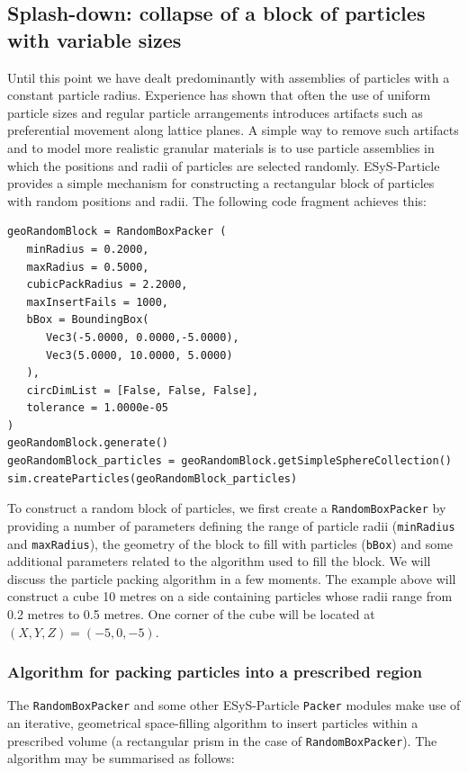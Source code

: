 \subsection{Splash-down: collapse of a block of particles with variable sizes}

Until this point we have dealt predominantly with assemblies of particles with a constant particle radius. Experience has shown that often the use of uniform particle sizes and regular particle arrangements introduces artifacts such as preferential movement along lattice planes. A simple way to remove such artifacts and to model more realistic granular materials is to use particle assemblies in which the positions and radii of particles are selected randomly. ESyS-Particle provides a simple mechanism for constructing a rectangular block of particles with random positions and radii. The following code fragment achieves this:

\begin{verbatim}
geoRandomBlock = RandomBoxPacker (
   minRadius = 0.2000,
   maxRadius = 0.5000,
   cubicPackRadius = 2.2000,
   maxInsertFails = 1000,
   bBox = BoundingBox(
      Vec3(-5.0000, 0.0000,-5.0000),
      Vec3(5.0000, 10.0000, 5.0000)
   ),
   circDimList = [False, False, False],
   tolerance = 1.0000e-05
)
geoRandomBlock.generate()
geoRandomBlock_particles = geoRandomBlock.getSimpleSphereCollection()
sim.createParticles(geoRandomBlock_particles)
\end{verbatim}

To construct a random block of particles, we first create a \texttt{RandomBoxPacker} by providing a number of parameters defining the range of particle radii (\texttt{minRadius} and \texttt{maxRadius}), the geometry of the block to fill with particles (\texttt{bBox}) and some additional parameters related to the algorithm used to fill the block. We will discuss the particle packing algorithm in a few moments. The example above will construct a cube 10 metres on a side containing particles whose radii range from 0.2 metres to 0.5 metres. One corner of the cube will be located at $(X,Y,Z) = (-5,0,-5)$. 

\subsubsection{Algorithm for packing particles into a prescribed region}

The \texttt{RandomBoxPacker} and some other ESyS-Particle \texttt{Packer} modules make use of an iterative, geometrical space-filling algorithm to insert particles within a prescribed volume (a rectangular prism in the case of \texttt{RandomBoxPacker}). The algorithm may be summarised as follows:

